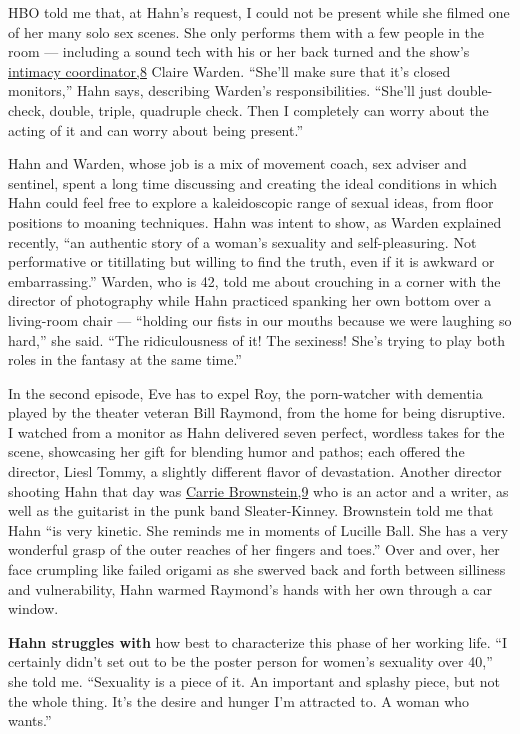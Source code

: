 HBO told me that, at Hahn's request, I could not be present while she
filmed one of her many solo sex scenes. She only performs them with a
few people in the room --- including a sound tech with his or her back
turned and the show's
\href{http://nytimes3xbfgragh.onion\#tooltip-8}{intimacy coordinator,8}
Claire Warden. ``She'll make sure that it's closed monitors,'' Hahn
says, describing Warden's responsibilities. ``She'll just double-check,
double, triple, quadruple check. Then I completely can worry about the
acting of it and can worry about being present.''

Hahn and Warden, whose job is a mix of movement coach, sex adviser and
sentinel, spent a long time discussing and creating the ideal conditions
in which Hahn could feel free to explore a kaleidoscopic range of sexual
ideas, from floor positions to moaning techniques. Hahn was intent to
show, as Warden explained recently, ``an authentic story of a woman's
sexuality and self-pleasuring. Not performative or titillating but
willing to find the truth, even if it is awkward or embarrassing.''
Warden, who is 42, told me about crouching in a corner with the director
of photography while Hahn practiced spanking her own bottom over a
living-room chair --- ``holding our fists in our mouths because we were
laughing so hard,'' she said. ``The ridiculousness of it! The sexiness!
She's trying to play both roles in the fantasy at the same time.''

In the second episode, Eve has to expel Roy, the porn-watcher with
dementia played by the theater veteran Bill Raymond, from the home for
being disruptive. I watched from a monitor as Hahn delivered seven
perfect, wordless takes for the scene, showcasing her gift for blending
humor and pathos; each offered the director, Liesl Tommy, a slightly
different flavor of devastation. Another director shooting Hahn that day
was \href{http://nytimes3xbfgragh.onion\#tooltip-9}{Carrie Brownstein,9}
who is an actor and a writer, as well as the guitarist in the punk band
Sleater-Kinney. Brownstein told me that Hahn ``is very kinetic. She
reminds me in moments of Lucille Ball. She has a very wonderful grasp of
the outer reaches of her fingers and toes.'' Over and over, her face
crumpling like failed origami as she swerved back and forth between
silliness and vulnerability, Hahn warmed Raymond's hands with her own
through a car window.

\textbf{Hahn struggles with} how best to characterize this phase of her
working life. ``I certainly didn't set out to be the poster person for
women's sexuality over 40,'' she told me. ``Sexuality is a piece of it.
An important and splashy piece, but not the whole thing. It's the desire
and hunger I'm attracted to. A woman who wants.''

